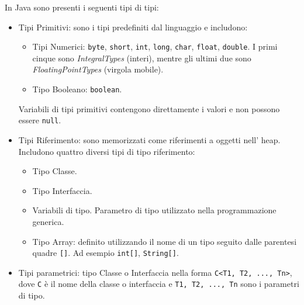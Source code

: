 In Java sono presenti i seguenti tipi di tipi:
\begin{itemize}
    \item Tipi Primitivi: sono i tipi predefiniti dal linguaggio e includono:
        \begin{itemize}
            \item Tipi Numerici: \texttt{byte}, \texttt{short}, \texttt{int}, \texttt{long}, \texttt{char}, \texttt{float}, \texttt{double}. I primi cinque sono \textit{IntegralTypes} (interi), mentre gli ultimi due sono \textit{FloatingPointTypes} (virgola mobile).
            \item Tipo Booleano: \texttt{boolean}.
        \end{itemize} 
        Variabili di tipi primitivi contengono direttamente i valori e non possono essere \texttt{null}.
    \item Tipi Riferimento: sono memorizzati come riferimenti a oggetti nell' heap. Includono quattro diversi tipi di tipo riferimento:
        \begin{itemize}
            \item Tipo Classe.
            \item Tipo Interfaccia.
            \item Variabili di tipo. Parametro di tipo utilizzato nella programmazione generica. 
            \item Tipo Array: definito utilizzando il nome di un tipo seguito dalle parentesi quadre \texttt{[]}. Ad esempio \texttt{int[]}, \texttt{String[]}.
        \end{itemize}
    \item Tipi parametrici: tipo Classe o Interfaccia nella forma \texttt{C<T1, T2, ..., Tn>}, dove \texttt{C} è il nome della classe o interfaccia e \texttt{T1, T2, ..., Tn} sono i parametri di tipo.
\end{itemize}

